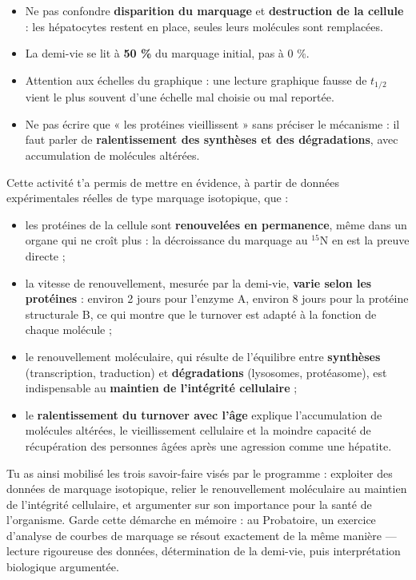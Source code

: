 \documentclass[11pt]{article}
\newcommand{\cle}[1]{{\popxbold\color{popdark}#1}}
\newcounter{popsec}
\newcounter{popsub}
\newcommand{\courssub}[1]{%
  \stepcounter{popsub}%
  \par\vspace{9pt}\noindent{\popxbold\fontsize{11.5}{13}\selectfont\color{popink}{\color{poporange}\thepopsec.\thepopsub}\hspace{6pt}#1}\par\nopagebreak\vspace{4pt}
}
\begin{document}
\begin{attention}
\begin{itemize}
\item Ne pas confondre \textbf{disparition du marquage} et \textbf{destruction de la cellule} : les hépatocytes restent en place, seules leurs molécules sont remplacées.
\item La demi-vie se lit à \textbf{50 \%} du marquage initial, pas à 0 \%.
\item Attention aux échelles du graphique : une lecture graphique fausse de $t_{1/2}$ vient le plus souvent d'une échelle mal choisie ou mal reportée.
\item Ne pas écrire que « les protéines vieillissent » sans préciser le mécanisme : il faut parler de \textbf{ralentissement des synthèses et des dégradations}, avec accumulation de molécules altérées.
\end{itemize}
\end{attention}

\courssub{Bilan de l'activité}

Cette activité t'a permis de mettre en évidence, à partir de données expérimentales réelles de type marquage isotopique, que :
\begin{itemize}
\item les protéines de la cellule sont \textbf{renouvelées en permanence}, même dans un organe qui ne croît plus : la décroissance du marquage au $^{15}$N en est la preuve directe ;
\item la vitesse de renouvellement, mesurée par la \cle{demi-vie}, \textbf{varie selon les protéines} : environ 2 jours pour l'enzyme A, environ 8 jours pour la protéine structurale B, ce qui montre que le turnover est adapté à la fonction de chaque molécule ;
\item le renouvellement moléculaire, qui résulte de l'équilibre entre \textbf{synthèses} (transcription, traduction) et \textbf{dégradations} (lysosomes, protéasome), est indispensable au \textbf{maintien de l'intégrité cellulaire} ;
\item le \textbf{ralentissement du turnover avec l'âge} explique l'accumulation de molécules altérées, le vieillissement cellulaire et la moindre capacité de récupération des personnes âgées après une agression comme une hépatite.
\end{itemize}

Tu as ainsi mobilisé les trois savoir-faire visés par le programme : exploiter des données de marquage isotopique, relier le renouvellement moléculaire au maintien de l'intégrité cellulaire, et argumenter sur son importance pour la santé de l'organisme. Garde cette démarche en mémoire : au Probatoire, un exercice d'analyse de courbes de marquage se résout exactement de la même manière — lecture rigoureuse des données, détermination de la demi-vie, puis interprétation biologique argumentée.
\end{document}
